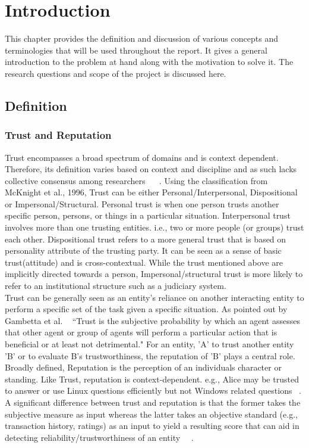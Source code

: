 \chapter{Introduction} \label{ch:intro}
This chapter provides the definition and discussion of various concepts and
terminologies that will be used throughout the report. It gives a general
introduction to the problem at hand along with the motivation to solve it.
The research questions and scope of the project is discussed here. 
\section{Definition}
\subsection{Trust and Reputation}
Trust encompasses a broad spectrum of domains and is context dependent.
Therefore, its definition varies based on context and discipline and as such
lacks collective consensus among researchers ~\cite{mcknight1996meanings} 
~\cite{mcknight2001trust}.
Using the classification from McKnight et al., 1996, Trust can be either
Personal/Interpersonal, Dispositional or Impersonal/Structural.
Personal trust is when one person trusts another specific person, persons, or
things in a particular situation. Interpersonal trust involves more than one
trusting entities. i.e., two or more people (or groups) trust each other.
Dispositional trust refers to a more general trust that is based on personality
attribute of the trusting party. It can be seen as a sense of basic
trust(attitude) and is cross-contextual. While the trust mentioned above are
implicitly directed towards a person, Impersonal/structural trust is more
likely to refer to an institutional structure such as a judiciary system. \\

Trust can be generally seen as an entity's reliance on another interacting
entity to perform a specific set of the task given a specific situation.  As
pointed out by Gambetta et al. ~\cite{gambetta2000can} ``Trust is the
subjective probability by which an agent assesses that other agent or group of
agents will perform a particular action that is beneficial or at least not
detrimental." For an entity, 'A' to trust another entity 'B' or to evaluate B's
trustworthiness, the reputation of 'B' plays a central role. Broadly defined,
Reputation is the perception of an individuals character or standing. Like
Trust, reputation is context-dependent. e.g., Alice may be trusted to answer or
use Linux questions efficiently but not Windows related questions
~\cite{zacharia2000collaborative}.  A significant difference between trust and
reputation is that the former takes the subjective measure as input whereas the
latter takes an objective standard (e.g., transaction history, ratings) as an
input to yield a resulting score that can aid in detecting
reliability/trustworthiness of an entity~\cite{Sabater2005}
~\cite{castelfranchi2000trust}. \\

